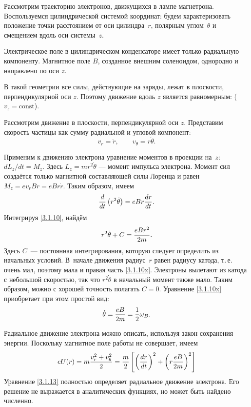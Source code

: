 \begin{labsupplement}

Рассмотрим траекторию электронов, движущихся в лампе магнетрона.
Воспользуемся цилиндрической системой координат: будем характеризовать 
положение точки расстоянием от оси цилиндра~$r$, 
полярным углом~$\theta$ и смещением вдоль оси системы~$z$.

Электрическое поле в цилиндрическом конденсаторе 
имеет только радиальную компоненту. Магнитное поле $B$, 
созданное внешним соленоидом, однородно и направлено по оси $z$.
 
В такой геометрии все силы, действующие на заряды, лежат в плоскости,
перпендикулярной оси $z$.  Поэтому движение вдоль $z$ является равномерным:
($v_z=\mathrm{const}$).

Рассмотрим движение в плоскости, перпендикулярной оси $z$. 
Представим скорость частицы как сумму радиальной и угловой компонент:
\[
 v_r=\dot{r},\qquad v_{\theta} = r\dot{\theta}.
\]

Применим к движению электрона уравнение моментов в проекции на~$z$:
$dL_z/dt = M_z$.
Здесь $L_z = mr^2 \dot{\theta}$ --- момент импульса электрона.
Момент сил создаётся только магнитной составляющей силы Лоренца и равен
$M_z = e v_r B r =  e B r \dot{r}$. Таким образом, имеем
\begin{equation}
\eqmark{3.1.10}
\frac{d}{dt}\left(r^2\dot{\theta}\right) = eBr\frac{dr}{dt}.
\end{equation}
Интегрируя \eqref{3.1.10}, найдём
\begin{equation}
	r^2\dot{\theta}+C=\frac{eBr^2}{2m}.
	\eqmark{3.1.10x}
\end{equation}
Здесь $C$~--- постоянная интегрирования, которую следует определить из начальных
условий. В~начале движения радиус~$r$ равен радиусу катода, т.\,е. очень мал,
поэтому мала и правая часть \eqref{3.1.10x}. Электроны вылетают из
катода с небольшой скоростью, так что $r^{2}\dot{\theta}$ в начальный момент
также мало. Таким образом, можно с хорошей точность полагать $C=0$. 
Уравнение \eqref{3.1.10x} приобретает при этом простой вид:
\begin{equation}
	\dot{\theta}=\frac{eB}{2m} = \frac12 \omega_B.
	\eqmark{3.1.12}
\end{equation}

Радиальное движение электрона можно описать, используя закон сохранения
энергии. Поскольку магнитное поле работы не совершает, имеем
\begin{equation}	\eqmark{3.1.13}
eU(r)=m\frac{v_r^2+v_\theta^2}{2} = 
\frac{m}{2} \left[\left(\frac{dr}{dt}\right)^2 + \left(r \frac{eB}{2m}\right)^{2}\right]
\end{equation}
Уравнение \eqref{3.1.13} полностью определяет радиальное 
движение электрона. Его решение не выражается в аналитических функциях,
но может быть найдено численно.


\end{labsupplement}
